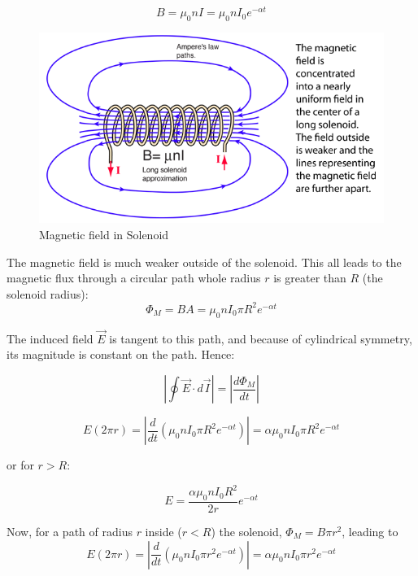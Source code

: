 \documentclass[14pt]{memoir}
\begin{document}
\begin{equation}
B = \mu_0 n I = \mu_0 n I_0 e^{-\alpha t}
\end{equation}

\begin{figure}[H]
\begin{center}
\includegraphics[scale=1.2]{fig/Bsolenoid}
\caption{Magnetic field in Solenoid}
\label{fig:Bsol}
\end{center}
\end{figure}

The magnetic field is much weaker outside of the solenoid. This all leads to the magnetic flux through a circular path whole radius $r$ is greater than $R$ (the solenoid radius):
\begin{equation}
\Phi_M = BA = \mu_0 n I_0 \pi R^2 e^{-\alpha t}
\end{equation}

The induced field $\vec{E}$ is tangent to this path, and because of cylindrical symmetry, its magnitude is constant on the path. Hence:

\begin{equation}
| \oint \vec{E} \cdot d \vec{I}| = |\frac{d \Phi_M}{dt}|
\end{equation}

\begin{equation}
E (2 \pi r) = |\frac{d}{dt} (\mu_0 n I_0 \pi R^2 e^{-\alpha t})| = \alpha \mu_0 n I_0 \pi R^2 e^{-\alpha t} 
\end{equation}

or for $r > R$:

\begin{equation}
E = \frac{\alpha \mu_0 n I_0 R^2}{2r} e^{-\alpha t} 
\end{equation}

Now, for a path of radius $r$ inside ($r<R$) the solenoid, $\Phi_M = B \pi r^2$, leading to 
 \begin{equation}
E (2 \pi r) = |\frac{d}{dt} (\mu_0 n I_0 \pi r^2 e^{-\alpha t})| = \alpha \mu_0 n I_0 \pi r^2 e^{-\alpha t} 
\end{equation}
\end{document}
